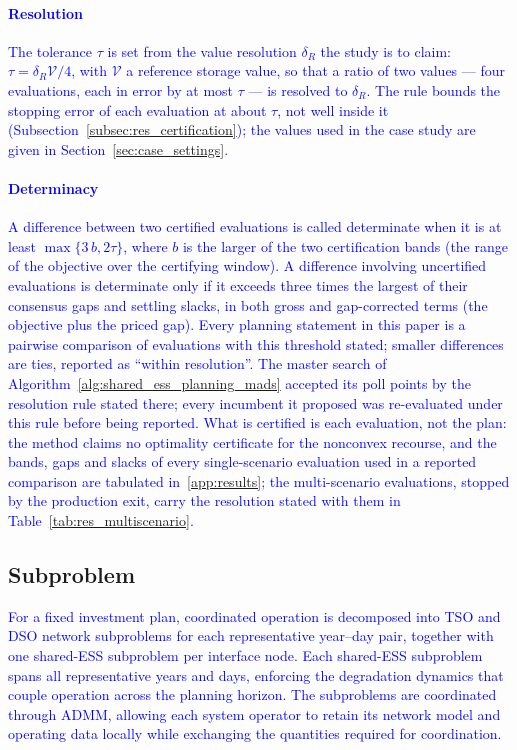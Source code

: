 \documentclass[preprint,12pt]{elsarticle}
\begin{document}
\textcolor{blue}{
    \paragraph{Resolution} The tolerance $\tau$ is set from the value resolution $\delta_R$ the study is to claim: $\tau = \delta_R \mathcal{V}/4$, with $\mathcal{V}$ a reference storage value, so that a ratio of two values --- four evaluations, each in error by at most $\tau$ --- is resolved to $\delta_R$. The rule bounds the stopping error of each evaluation at about $\tau$, not well inside it (Subsection~\ref{subsec:res_certification}); the values used in the case study are given in Section~\ref{sec:case_settings}.
}

\textcolor{blue}{
    \paragraph{Determinacy} A difference between two certified evaluations is called determinate when it is at least $\max\{3\,b, 2\tau\}$, where $b$ is the larger of the two certification bands (the range of the objective over the certifying window). A difference involving uncertified evaluations is determinate only if it exceeds three times the largest of their consensus gaps and settling slacks, in both gross and gap-corrected terms (the objective plus the priced gap). Every planning statement in this paper is a pairwise comparison of evaluations with this threshold stated; smaller differences are ties, reported as ``within resolution''. The master search of Algorithm~\ref{alg:shared_ess_planning_mads} accepted its poll points by the resolution rule stated there; every incumbent it proposed was re-evaluated under this rule before being reported. What is certified is each evaluation, not the plan: the method claims no optimality certificate for the nonconvex recourse, and the bands, gaps and slacks of every single-scenario evaluation used in a reported comparison are tabulated in~\ref{app:results}; the multi-scenario evaluations, stopped by the production exit, carry the resolution stated with them in Table~\ref{tab:res_multiscenario}.
}

\subsection{Subproblem}
\label{subsec:subproblem}

\textcolor{blue}{
    For a fixed investment plan, coordinated operation is decomposed into TSO and DSO network subproblems for each representative year--day pair, together with one shared-ESS subproblem per interface node. Each shared-ESS subproblem spans all representative years and days, enforcing the degradation dynamics that couple operation across the planning horizon. The subproblems are coordinated through ADMM, allowing each system operator to retain its network model and operating data locally while exchanging the quantities required for coordination.
}
\end{document}
